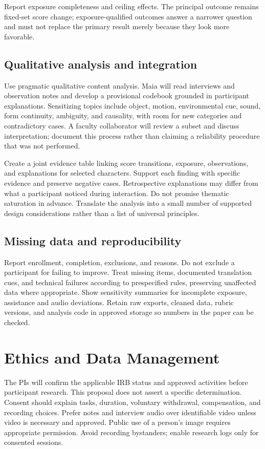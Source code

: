 \documentclass[11pt,letterpaper]{article}
\begin{document}
Report exposure completeness and ceiling effects. The principal outcome remains fixed-set score change; exposure-qualified outcomes answer a narrower question and must not replace the primary result merely because they look more favorable.

\subsection{Qualitative analysis and integration}
Use pragmatic qualitative content analysis. Maia will read interviews and observation notes and develop a provisional codebook grounded in participant explanations. Sensitizing topics include object, motion, environmental cue, sound, form continuity, ambiguity, and causality, with room for new categories and contradictory cases. A faculty collaborator will review a subset and discuss interpretation; document this process rather than claiming a reliability procedure that was not performed.

Create a joint evidence table linking score transitions, exposure, observations, and explanations for selected characters. Support each finding with specific evidence and preserve negative cases. Retrospective explanations may differ from what a participant noticed during interaction. Do not promise thematic saturation in advance. Translate the analysis into a small number of supported design considerations rather than a list of universal principles.

\subsection{Missing data and reproducibility}
Report enrollment, completion, exclusions, and reasons. Do not exclude a participant for failing to improve. Treat missing items, documented translation cues, and technical failures according to prespecified rules, preserving unaffected data where appropriate. Show sensitivity summaries for incomplete exposure, assistance and audio deviations. Retain raw exports, cleaned data, rubric versions, and analysis code in approved storage so numbers in the paper can be checked.

\section{Ethics and Data Management}
The PIs will confirm the applicable IRB status and approved activities before participant research. This proposal does not assert a specific determination. Consent should explain tasks, duration, voluntary withdrawal, compensation, and recording choices. Prefer notes and interview audio over identifiable video unless video is necessary and approved. Public use of a person's image requires appropriate permission. Avoid recording bystanders; enable research logs only for consented sessions.
\end{document}
